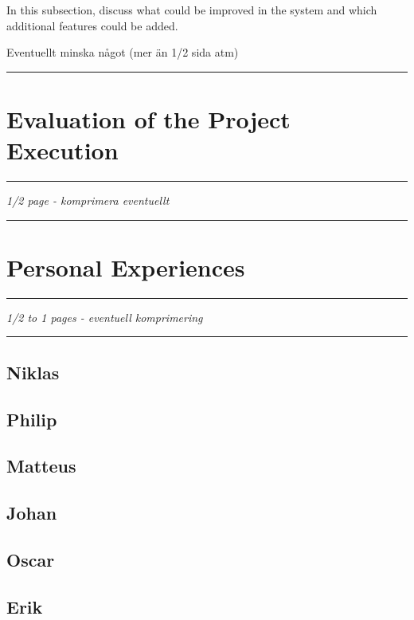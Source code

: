 In this subsection, discuss what could be improved in the system and which additional features could be added. \em

Eventuellt minska något (mer än 1/2 sida atm)
\hrule


\section{Evaluation of the Project Execution}\label{cha:eval}
\hrule
\em 1/2 page - komprimera eventuellt 

\em
\hrule



\section{Personal Experiences}\label{cha:personalexp}
\hrule\em
1/2 to 1 pages - eventuell komprimering 

\hrule

\subsection{Niklas}

\subsection{Philip}

\subsection{Matteus}

\subsection{Johan}

\subsection{Oscar}

\subsection{Erik}



